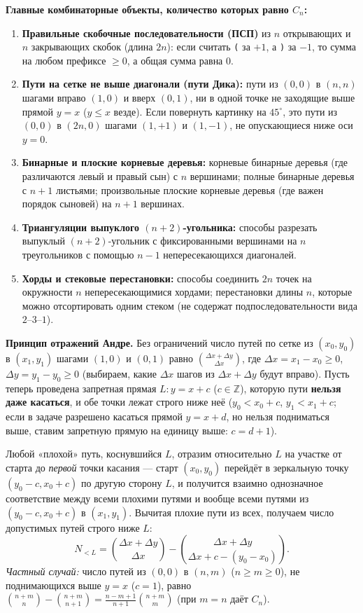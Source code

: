 \documentclass[10pt,a4paper]{article}
\renewcommand{\le}{\leqslant}
\renewcommand{\ge}{\geqslant}
\newcommand{\Z}{\mathbb{Z}}
\begin{document}
\textbf{Главные комбинаторные объекты, количество которых равно $C_n$:}
\begin{enumerate}
  \item \textbf{Правильные скобочные последовательности (ПСП)} из $n$ открывающих и $n$ закрывающих скобок (длина $2n$): если считать \texttt{(} за $+1$, а \texttt{)} за $-1$, то сумма на любом префиксе $\ge 0$, а общая сумма равна $0$.
  \item \textbf{Пути на сетке не выше диагонали (пути Дика):} пути из $(0, 0)$ в $(n, n)$ шагами вправо $(1, 0)$ и вверх $(0, 1)$, ни в одной точке не заходящие выше прямой $y = x$ ($y \le x$ везде). Если повернуть картинку на $45^\circ$, это пути из $(0, 0)$ в $(2n, 0)$ шагами $(1, +1)$ и $(1, -1)$, не опускающиеся ниже оси $y = 0$.
  \item \textbf{Бинарные и плоские корневые деревья:} корневые бинарные деревья (где различаются левый и правый сын) с $n$ вершинами; полные бинарные деревья с $n + 1$ листьями; произвольные плоские корневые деревья (где важен порядок сыновей) на $n + 1$ вершинах.
  \item \textbf{Триангуляции выпуклого $(n + 2)$-угольника:} способы разрезать выпуклый $(n + 2)$-угольник с фиксированными вершинами на $n$ треугольников с помощью $n - 1$ непересекающихся диагоналей.
  \item \textbf{Хорды и стековые перестановки:} способы соединить $2n$ точек на окружности $n$ непересекающимися хордами; перестановки длины $n$, которые можно отсортировать одним стеком (не содержат подпоследовательности вида $2\text{--}3\text{--}1$).
\end{enumerate}

\textbf{Принцип отражений Андре.} Без ограничений число путей по сетке из $(x_0, y_0)$ в $(x_1, y_1)$ шагами $(1, 0)$ и $(0, 1)$ равно $\binom{\Delta x + \Delta y}{\Delta x}$, где $\Delta x = x_1 - x_0 \ge 0$, $\Delta y = y_1 - y_0 \ge 0$ (выбираем, какие $\Delta x$ шагов из $\Delta x + \Delta y$ будут вправо). Пусть теперь проведена запретная прямая $L : y = x + c$ ($c \in \Z$), которую пути \textbf{нельзя даже касаться}, и обе точки лежат строго ниже неё ($y_0 < x_0 + c$, $y_1 < x_1 + c$; если в задаче разрешено касаться прямой $y = x + d$, но нельзя подниматься выше, ставим запретную прямую на единицу выше: $c = d + 1$).

Любой «плохой» путь, коснувшийся $L$, отразим относительно $L$ на участке от старта до \emph{первой} точки касания — старт $(x_0, y_0)$ перейдёт в зеркальную точку $(y_0 - c, x_0 + c)$ по другую сторону $L$, и получится взаимно однозначное соответствие между всеми плохими путями и вообще всеми путями из $(y_0 - c, x_0 + c)$ в $(x_1, y_1)$. Вычитая плохие пути из всех, получаем число допустимых путей строго ниже $L$:
\[
  N_{< L} = \binom{\Delta x + \Delta y}{\Delta x} - \binom{\Delta x + \Delta y}{\Delta x + c - (y_0 - x_0)}.
\]
\emph{Частный случай:} число путей из $(0, 0)$ в $(n, m)$ ($n \ge m \ge 0$), не поднимающихся выше $y = x$ ($c = 1$), равно $\binom{n + m}{n} - \binom{n + m}{n + 1} = \frac{n - m + 1}{n + 1}\binom{n + m}{m}$ (при $m = n$ даёт $C_n$).
\end{document}
